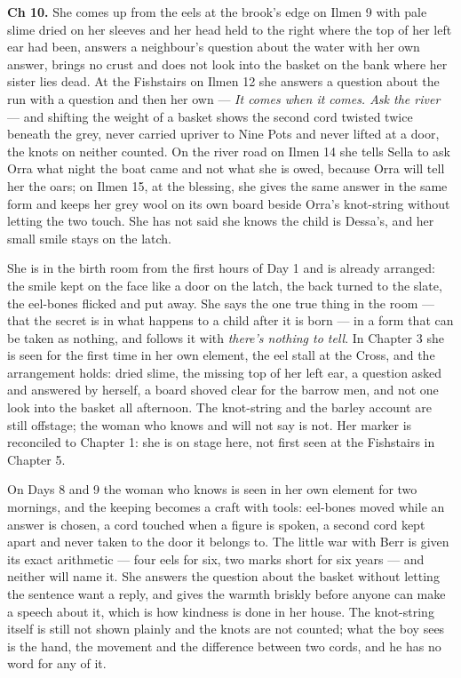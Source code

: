 \documentclass{design/chronicle}
\begin{document}
{\textbf{Ch 10.} She comes up from the eels at the brook’s edge on Ilmen 9 with pale slime dried on her sleeves and her head held to the right where the top of her left ear had been, answers a neighbour’s question about the water with her own answer, brings no crust and does not look into the basket on the bank where her sister lies dead. At the Fishstairs on Ilmen 12 she answers a question about the run with a question and then her own --- \emph{It comes when it comes. Ask the river} --- and shifting the weight of a basket shows the second cord twisted twice beneath the grey, never carried upriver to Nine Pots and never lifted at a door, the knots on neither counted. On the river road on Ilmen 14 she tells Sella to ask Orra what night the boat came and not what she is owed, because Orra will tell her the oars; on Ilmen 15, at the blessing, she gives the same answer in the same form and keeps her grey wool on its own board beside Orra’s knot-string without letting the two touch. She has not said she knows the child is Dessa’s, and her small smile stays on the latch.

She is in the birth room from the first hours of Day 1 and is already arranged: the smile kept on the face like a door on the latch, the back turned to the slate, the eel-bones flicked and put away. She says the one true thing in the room --- that the secret is in what happens to a child after it is born --- in a form that can be taken as nothing, and follows it with \emph{there’s nothing to tell}. In Chapter 3 she is seen for the first time in her own element, the eel stall at the Cross, and the arrangement holds: dried slime, the missing top of her left ear, a question asked and answered by herself, a board shoved clear for the barrow men, and not one look into the basket all afternoon. The knot-string and the barley account are still offstage; the woman who knows and will not say is not. Her marker is reconciled to Chapter 1: she is on stage here, not first seen at the Fishstairs in Chapter 5.

On Days 8 and 9 the woman who knows is seen in her own element for two mornings, and the keeping becomes a craft with tools: eel-bones moved while an answer is chosen, a cord touched when a figure is spoken, a second cord kept apart and never taken to the door it belongs to. The little war with Berr is given its exact arithmetic --- four eels for six, two marks short for six years --- and neither will name it. She answers the question about the basket without letting the sentence want a reply, and gives the warmth briskly before anyone can make a speech about it, which is how kindness is done in her house. The knot-string itself is still not shown plainly and the knots are not counted; what the boy sees is the hand, the movement and the difference between two cords, and he has no word for any of it.

}
\end{document}
